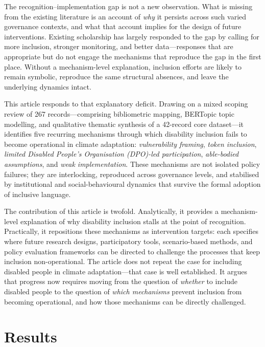 \documentclass[12pt,a4paper]{article}
\begin{document}
The recognition--implementation gap is not a new observation. What is missing from the existing literature is an account of \textit{why} it persists across such varied governance contexts, and what that account implies for the design of future interventions. Existing scholarship has largely responded to the gap by calling for more inclusion, stronger monitoring, and better data---responses that are appropriate but do not engage the mechanisms that reproduce the gap in the first place. Without a mechanism-level explanation, inclusion efforts are likely to remain symbolic, reproduce the same structural absences, and leave the underlying dynamics intact.

This article responds to that explanatory deficit. Drawing on a mixed scoping review of 267 records---comprising bibliometric mapping, BERTopic topic modelling, and qualitative thematic synthesis of a 42-record core dataset---it identifies five recurring mechanisms through which disability inclusion fails to become operational in climate adaptation: \textit{vulnerability framing}, \textit{token inclusion}, \textit{limited Disabled People's Organisation (DPO)-led participation}, \textit{able-bodied assumptions}, and \textit{weak implementation}. These mechanisms are not isolated policy failures; they are interlocking, reproduced across governance levels, and stabilised by institutional and social-behavioural dynamics that survive the formal adoption of inclusive language.

The contribution of this article is twofold. Analytically, it provides a mechanism-level explanation of why disability inclusion stalls at the point of recognition. Practically, it repositions these mechanisms as intervention targets: each specifies where future research designs, participatory tools, scenario-based methods, and policy evaluation frameworks can be directed to challenge the processes that keep inclusion non-operational. The article does not repeat the case for including disabled people in climate adaptation---that case is well established. It argues that progress now requires moving from the question of \textit{whether} to include disabled people to the question of \textit{which mechanisms} prevent inclusion from becoming operational, and how those mechanisms can be directly challenged.


\section*{Results}
\end{document}
